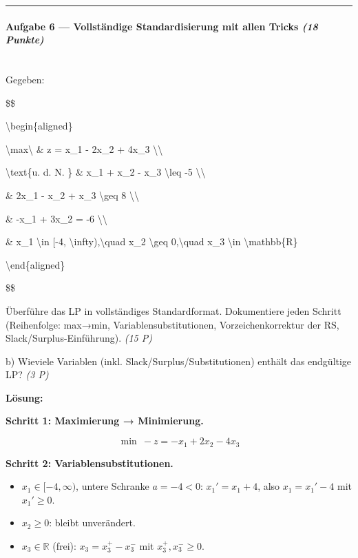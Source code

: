 \documentclass[11pt, a4paper]{article}
\begin{document}
\noindent\textcolor{rulegray}{\rule{\linewidth}{0.4pt}}


\paragraph{Aufgabe 6 — Vollständige Standardisierung mit allen Tricks \textit{(18 Punkte)}}\mbox{}\\[2pt]

Gegeben:


\$\$

\textbackslash{}begin\{aligned\}

\textbackslash{}max\textbackslash{} \& z = x\_1 - 2x\_2 + 4x\_3 \textbackslash{}\textbackslash{}

\textbackslash{}text\{u. d. N. \} \& x\_1 + x\_2 - x\_3 \textbackslash{}leq -5 \textbackslash{}\textbackslash{}

\& 2x\_1 - x\_2 + x\_3 \textbackslash{}geq 8 \textbackslash{}\textbackslash{}

\& -x\_1 + 3x\_2 = -6 \textbackslash{}\textbackslash{}

\& x\_1 \textbackslash{}in [-4, \textbackslash{}infty),\textbackslash{}quad x\_2 \textbackslash{}geq 0,\textbackslash{}quad x\_3 \textbackslash{}in \textbackslash{}mathbb\{R\}

\textbackslash{}end\{aligned\}

\$\$


Überführe das LP in vollständiges Standardformat. Dokumentiere jeden Schritt (Reihenfolge: max→min, Variablensubstitutionen, Vorzeichenkorrektur der RS, Slack/Surplus-Einführung). \textit{(15 P)}


b) Wieviele Variablen (inkl. Slack/Surplus/Substitutionen) enthält das endgültige LP? \textit{(3 P)}


\textbf{Lösung:}


\textbf{Schritt 1: Maximierung → Minimierung.}

\[
\min\ -z = -x_1 + 2x_2 - 4x_3
\]


\textbf{Schritt 2: Variablensubstitutionen.}

\begin{itemize}
  \item $x_1 \in [-4, \infty)$, untere Schranke $a = -4 < 0$: $x_1' = x_1 + 4$, also $x_1 = x_1' - 4$ mit $x_1' \geq 0$.
  \item $x_2 \geq 0$: bleibt unverändert.
  \item $x_3 \in \mathbb{R}$ (frei): $x_3 = x_3^+ - x_3^-$ mit $x_3^+, x_3^- \geq 0$.
\end{itemize}
\end{document}
